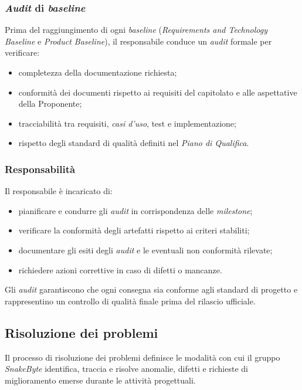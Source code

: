 \documentclass[10pt, letterpaper]{article}
\begin{document}
\subsubsection{\textit{Audit} di \textit{baseline}}
Prima del raggiungimento di ogni \textit{baseline} (\textit{Requirements and Technology Baseline} e
\textit{Product Baseline}), il responsabile conduce un \textit{audit} formale per verificare:
\begin{itemize}
    \item completezza della documentazione richiesta;
    \item conformità dei documenti rispetto ai requisiti del capitolato e alle aspettative della Proponente;
    \item tracciabilità tra requisiti, \textit{casi d'uso}, test e implementazione;
    \item rispetto degli standard di qualità definiti nel \textit{Piano di Qualifica}.
\end{itemize}

\subsubsection{Responsabilità}
Il responsabile è incaricato di:
\begin{itemize}
    \item pianificare e condurre gli \textit{audit} in corrispondenza delle \textit{milestone};
    \item verificare la conformità degli artefatti rispetto ai criteri stabiliti;
    \item documentare gli esiti degli \textit{audit} e le eventuali non conformità rilevate;
    \item richiedere azioni correttive in caso di difetti o mancanze.
\end{itemize}
Gli \textit{audit} garantiscono che ogni consegna sia conforme agli standard di progetto
e rappresentino un controllo di qualità finale prima del rilascio ufficiale.

\subsection{Risoluzione dei problemi}
Il processo di risoluzione dei problemi definisce le modalità con cui il gruppo
\textit{SnakeByte} identifica, traccia e risolve anomalie, difetti e richieste
di miglioramento emerse durante le attività progettuali.
\end{document}
